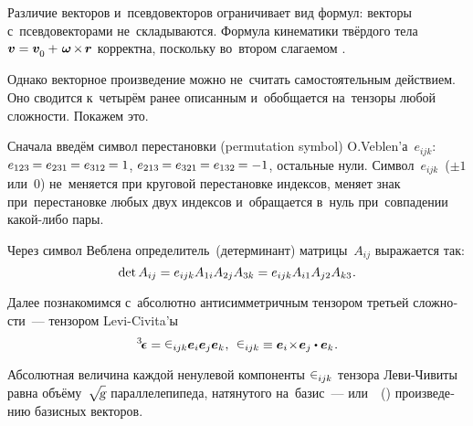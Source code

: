 \begin{otherlanguage}{russian}
Различие векторов и~псевдовекторов ограничивает вид формул: векторы с~псевдовекторами не~складываются. Формула кинематики твёрдого тела ${\bm{v} = \bm{v}_{\raisemath{-0.4ex}{0}} +\hspace{0.2ex} \bm{\omega} \hspace{-0.2ex}\times\hspace{-0.2ex} \bm{r}}$ корректна, поскольку во~втором слагаемом .

Однако векторное произведение можно не~считать самостоятельным действием. Оно сводится к~четырём ранее описанным и~обобщается на~тензоры любой сложности. Покажем это.

Сначала введём символ перестановки (permutation symbol) \hbox{O.\hspace{0.1ex}Veblen’а}~${e_{ijk}}$: ${e_{123} \hspace{-0.15ex}= e_{231} \hspace{-0.15ex}= e_{312} \hspace{-0.15ex}= 1}$, ${e_{213} \hspace{-0.15ex}= e_{321} \hspace{-0.15ex}= e_{132} \hspace{-0.15ex}= -1}$, остальные нули. Символ~${e_{ijk}}$~(${\pm 1}$ или~$0$) не~меняется при круговой перестановке индексов, меняет знак при~перестановке любых двух индексов и~обращается в~нуль при~совпадении какой\hbox{-}либо пары.

Через символ Веблена определитель~(детерминант) матрицы~${A_{ij}}$ выражается так:
\[ \operatorname{det} A_{ij} = e_{ijk} A_{1i} A_{2j} A_{3k} = e_{ijk} A_{i1} A_{j2} A_{k3} \hspace{0.1ex} . \]

Далее познакомимся с~абсолютно антисимметричным тензором третьей сложности~--- тензором Levi\hbox{-}Civita\hspace{-0.1ex}’ы
\vspace{0.1em}\begin{equation}\label{levicivitaintro}
\levicivitatensor = \levicivita_{ijk} \bm{e}_i \bm{e}_j \bm{e}_k \hspace{0.1ex}, \:\:
\levicivita_{ijk} \equiv \bm{e}_i \!\times\! \bm{e}_j \dotp \bm{e}_k \hspace{0.1ex}.
\end{equation}

Абсолютная величина каждой ненулевой компоненты ${\levicivita_{ijk}}$ тензора Леви\hbox{-\!}Чивиты
равна объёму~\!${\sqrt{\hspace{-0.36ex}\mathstrut{\textsl{g}}}}$ параллелепипеда, натянутого на~базис~---  или~~() произведению базисных векторов.


\end{otherlanguage}
